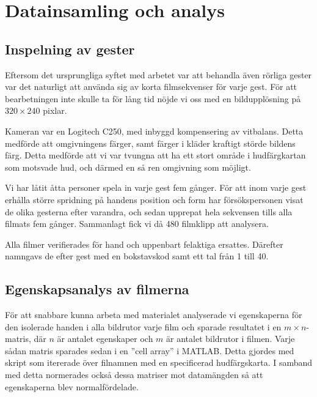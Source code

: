 \documentclass[../rapport_MVEX01-11-05]{subfiles}
\begin{document}
\section{Datainsamling och analys}

\subsection{Inspelning av gester}
Eftersom det ursprungliga syftet med arbetet var att behandla även rörliga
gester var det naturligt att använda sig av korta filmsekvenser för varje gest.
För att bearbetningen inte skulle ta för lång tid nöjde vi oss med en
bildupplösning på $320\times240$ pixlar.

Kameran var en Logitech C250, med inbyggd kompensering av vitbalans. Detta
medförde att omgivningens färger, samt färger i kläder kraftigt störde bildens 
färg. Detta medförde att vi var tvungna att ha ett stort område i hudfärgkartan
som motsvade hud, och därmed en så ren omgivning som möjligt.

Vi har låtit åtta personer spela in varje gest fem gånger.
För att inom varje gest erhålla större spridning på handens position och form
har försökspersonen visat de olika gesterna efter varandra, och sedan
upprepat hela sekvensen tills alla filmats fem gånger. Sammanlagt fick vi då 480
filmklipp att analysera.

Alla filmer verifierades för hand och uppenbart felaktiga ersattes. Därefter
namngavs de efter gest med en bokstavskod samt ett tal från 1 till 40.

\subsection{Egenskapsanalys av filmerna}
För att snabbare kunna arbeta med materialet analyserade vi
egenskaperna för den isolerade handen i alla bildrutor varje film och sparade
resultatet i en $m\times n$-matris, där $n$ är antalet egenskaper och $m$ är
antalet bildrutor i filmen. Varje sådan matris sparades sedan i en ''cell array''
i MATLAB. Detta gjordes med skript som itererade över filnamnen
med en specificerad hudfärgskarta. I samband med detta normerades också dessa
matriser mot datamängden så att egenskaperna blev normalfördelade.
\end{document}
